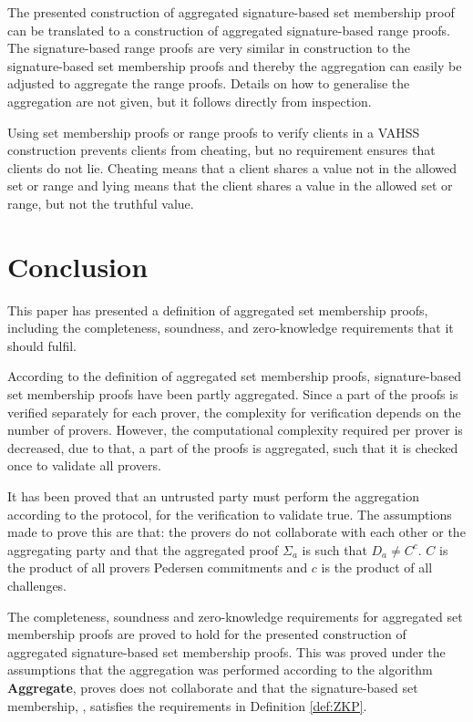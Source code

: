 The presented construction of aggregated signature-based set membership proof can be translated to a construction of aggregated signature-based range proofs. The signature-based range proofs are very similar in construction to the signature-based set membership proofs and thereby the aggregation can easily be adjusted to aggregate the range proofs. Details on how to generalise the aggregation are not given, but it follows directly from inspection.
 
Using set membership proofs or range proofs to verify clients in a VAHSS construction prevents clients from cheating, but no requirement ensures that clients do not lie. Cheating means that a client shares a value not in the allowed set or range and lying means that the client shares a value in the allowed set or range, but not the truthful value.

\section*{Conclusion}

This paper has presented a definition of aggregated set membership proofs, including the completeness, soundness, and zero-knowledge requirements that it should fulfil.

According to the definition of aggregated set membership proofs, signature-based set membership proofs have been partly aggregated. Since a part of the proofs is verified separately for each prover, the complexity for verification depends on the number of provers. However, the computational complexity required per prover is decreased, due to that, a part of the proofs is aggregated, such that it is checked once to validate all provers. 

It has been proved that an untrusted party must perform the aggregation according to the protocol, for the verification to validate true. The assumptions made to prove this are that: the provers do not collaborate  with each other or the aggregating party and that the aggregated proof $\Sigma_a$ is such that $D_a\neq C^c$. $C$ is the product of all provers Pedersen commitments and $c$ is the product of all challenges. 

The completeness, soundness and zero-knowledge requirements for aggregated set membership proofs are proved to hold for the presented construction of aggregated signature-based set membership proofs. This was proved under the assumptions that the aggregation was performed according to the algorithm \textbf{Aggregate}, proves does not collaborate and that the signature-based set membership, \cite{RANGE-SET}, satisfies the requirements in Definition \ref{def:ZKP}. 



